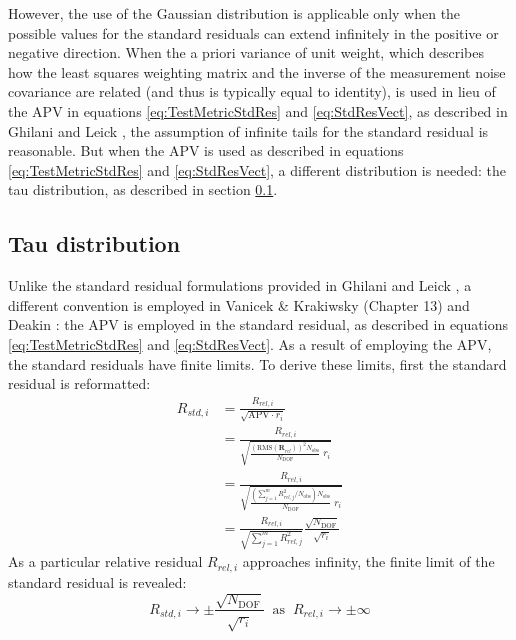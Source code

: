 However, the use of the Gaussian distribution is applicable only when the possible values for the standard residuals can extend infinitely in the positive or negative direction. When the a priori variance of unit weight, which describes how the least squares weighting matrix and the inverse of the measurement noise covariance are related (and thus is typically equal to identity), is used in lieu of the APV in equations \ref{eq:TestMetricStdRes} and \ref{eq:StdResVect}, as described in Ghilani \cite{ghilani} and Leick \cite{leick}, the assumption of infinite tails for the standard residual is reasonable. But when the APV is used as described in equations \ref{eq:TestMetricStdRes} and \ref{eq:StdResVect}, a different distribution is needed: the tau distribution, as described in section \ref{sec:TauDist}.

\subsection{Tau distribution} \label{sec:TauDist}

Unlike the standard residual formulations provided in Ghilani \cite{ghilani} and Leick \cite{leick}, a different convention is employed in Vanicek \& Krakiwsky (Chapter 13) \cite{vanicek1982geodesy} and Deakin \cite{deakin2018tau}: the APV is employed in the standard residual, as described in equations \ref{eq:TestMetricStdRes} and \ref{eq:StdResVect}. As a result of employing the APV, the standard residuals have finite limits. To derive these limits, first the standard residual is reformatted:
\begin{equation}\label{eq:StdRes}
\begin{split}
R_{std,i} &= \frac{R_{rel,i}}{\sqrt{\text{APV} \cdot r_i}} \\
&= \frac{R_{rel,i}}{\sqrt{\frac{(\text{RMS}(\textbf{R}_{rel}))^2 N_{\text{obs}}}{N_{\text{DOF}}} \; r_i}} \\
&= \frac{R_{rel,i}}{\sqrt{\frac{(\sum_{j=1}^{m} R_{rel,j}^2/N_{\text{obs}}) N_{\text{obs}}}{N_{\text{DOF}}} \; r_i}} \\
&= \frac{R_{rel,i}}{\sqrt{\sum_{j=1}^{m} R_{rel,j}^2}} \frac{\sqrt{N_{\text{DOF}}}}{\sqrt{r_i}}
\end{split}
\end{equation}
As a particular relative residual $R_{rel,i}$ approaches infinity, the finite limit of the standard residual is revealed:
\begin{equation}\label{eq:StdResLimit}
R_{std,i} \rightarrow \pm \frac{\sqrt{N_{\text{DOF}}}}{\sqrt{r_i}} \;\; \text{as} \;\; R_{rel,i} \rightarrow \pm \infty
\end{equation}


